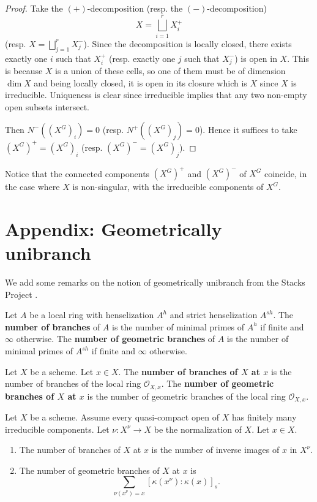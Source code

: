 \documentclass[12pt]{article}
\begin{document}
\begin{proof}
Take the $(+)$-decomposition (resp. the $(-)$-decomposition) \[X = \bigsqcup_{i=1}^r X_i^+\] (resp. $X = \bigsqcup_{j=1}^r X_j^-$). Since the decomposition is locally closed, there exists exactly one $i$ such that $X_i^+$ (resp. exactly one $j$ such that $X_j^-$) is open in $X$. This is because $X$ is a union of these cells, so one of them must be of dimension $\dim X$ and being locally closed, it is open in its closure which is $X$ since $X$ is irreducible. Uniqueness is clear since irreducible implies that any two non-empty open subsets intersect.

Then $N^-((X^G)_i) = 0$ (resp. $N^+((X^G)_j) = 0$). Hence it suffices to take $(X^G)^+ = (X^G)_i$ (resp. $(X^G)^- = (X^G)_j$).
\end{proof}

Notice that the connected components $(X^G)^+$ and $(X^G)^-$ of $X^G$ coincide, in the case where $X$ is non-singular, with the irreducible components of $X^G$.

\section{Appendix: Geometrically unibranch}
We add some remarks on the notion of geometrically unibranch from the Stacks Project \cite{Stacks}.
\begin{definition}
Let $A$ be a local ring with henselization $A^h$ and strict henselization $A^{sh}$.
The \textbf{number of branches} of $A$ is the number of minimal primes of $A^h$ if finite
and $\infty$ otherwise.
The \textbf{number of geometric branches} of $A$ is the number of minimal primes of
$A^{sh}$ if finite and $\infty$ otherwise.
\end{definition}

\begin{definition}
Let $X$ be a scheme. Let $x \in X$.  
The \textbf{number of branches of $X$ at $x$} is the number of branches of the local ring
$\mathcal{O}_{X,x}$. The \textbf{number of geometric branches of $X$ at $x$} is the number of geometric branches
of the local ring $\mathcal{O}_{X,x}$.
\end{definition}

\begin{lemma}[33.40.1]
Let $X$ be a scheme. Assume every quasi-compact open of $X$ has finitely many irreducible components.
Let $\nu : X^\nu \to X$ be the normalization of $X$. Let $x \in X$.
\begin{enumerate}
    \item The number of branches of $X$ at $x$ is the number of inverse images of $x$ in $X^\nu$.
    \item The number of geometric branches of $X$ at $x$ is
    \[
        \sum_{\nu(x^\nu) = x} [\kappa(x^\nu) : \kappa(x)]_s.
    \]
\end{enumerate}
\end{lemma}
\end{document}
